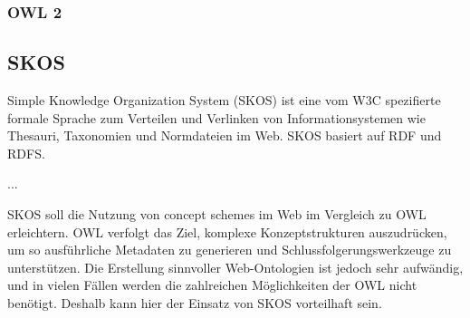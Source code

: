 	
	\subsubsection{OWL 2}
	
	\subsection{SKOS}
	Simple Knowledge Organization System (SKOS) ist eine vom W3C spezifierte formale Sprache zum Verteilen und Verlinken von Informationsystemen wie Thesauri, Taxonomien und Normdateien im Web. SKOS basiert auf RDF und RDFS.
	
	...
	
	SKOS soll die Nutzung von concept schemes im Web im Vergleich zu OWL erleichtern. OWL verfolgt das Ziel, komplexe Konzeptstrukturen auszudrücken, um so ausführliche Metadaten zu generieren und Schlussfolgerungswerkzeuge zu unterstützen. Die Erstellung sinnvoller Web-Ontologien ist jedoch sehr aufwändig, und in vielen Fällen werden die zahlreichen Möglichkeiten der OWL nicht benötigt. Deshalb kann hier der Einsatz von SKOS vorteilhaft sein.
	
	
	
	
